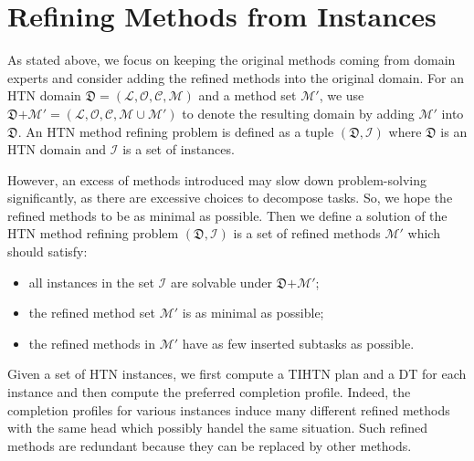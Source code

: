 \documentclass[letterpaper]{article} %
\newcommand{\Operators}{\mathcal{O}}
\newcommand{\Cactions}{\mathcal{C}}
\newcommand{\HtnDomain}{\mathfrak{D}}
\newcommand{\Methods}{\mathcal{M}}
\newcommand{\Lvar}{\mathcal{L}}
\newcommand{\aspplus}{\textsf{+}}
\newcommand{\Instances}{\mathcal{I}}
\begin{document}
\section{Refining Methods from Instances}
As stated above, we focus on keeping the original methods coming from domain experts and consider adding the refined methods into the original domain.
For an HTN domain $\HtnDomain = (\Lvar,\Operators,\Cactions,\Methods)$ and a method set $\Methods'$, we use  $\HtnDomain \aspplus \Methods'=(\Lvar,\Operators,\Cactions,\Methods\cup \Methods')$ to denote the resulting domain by adding $\Methods'$ into $\HtnDomain$.
An HTN method refining problem is defined as a tuple $(\HtnDomain,\Instances)$ where $\HtnDomain$ is an HTN domain and $\Instances$ is a set of instances.

However, an excess of methods introduced may slow down problem-solving significantly, as there are excessive choices to decompose tasks.
So, we hope the refined methods to be as minimal as possible.
Then we define a solution of the HTN method refining problem $(\HtnDomain,\Instances)$ is a set of refined methods $\Methods'$ which should satisfy:
\begin{itemize}
\item all instances in the set $\Instances$ are solvable under $\HtnDomain \aspplus \Methods'$;
\item the refined method set $\Methods'$ is as minimal as possible;
\item the refined methods in $\Methods'$ have as few inserted subtasks as possible.
\end{itemize}

Given a set of HTN instances, we first compute a TIHTN plan and a DT for each instance and then compute the preferred completion profile.
Indeed, the completion profiles for various instances induce many different refined methods with the same head which possibly handel the same situation.%
Such refined methods are redundant because they can be replaced by other methods.
\end{document}
